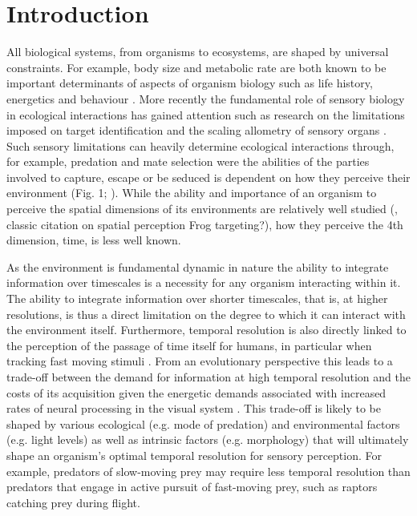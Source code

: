 \section{Introduction}

All biological systems, from organisms to ecosystems, are shaped by universal constraints. For example, body size and metabolic rate are both known to be important determinants of aspects of organism biology such as life history, energetics and behaviour \citep{brown2004, woodward2005, sibly2012metabolic}. More recently the fundamental role of sensory biology in ecological interactions has gained attention such as research on the limitations imposed on target identification and the scaling allometry of sensory organs \citep{howland2004allometry,cronin2005role,garamszegi2002coevolving}. Such sensory limitations can heavily determine ecological interactions through, for example, predation and mate selection were the abilities of the parties involved to capture, escape or be seduced is dependent on how they perceive their environment (Fig. 1; \citealt{cronin2005role,clark2012field,hornstein2000sexual,stevens2007predator}). While the ability and importance of an organism to perceive the spatial dimensions of its environments are relatively well studied (\citep{cronin2005role,clark2012field}, classic citation on spatial perception Frog targeting?), how they perceive the 4th dimension, time, is less well known.

As the environment is fundamental dynamic in nature the ability to integrate information over timescales is a necessity for any organism interacting within it. The ability to integrate information over shorter timescales, that is, at higher resolutions, is thus a direct limitation on the degree to which it can interact with the environment itself. Furthermore, temporal resolution is also directly linked to the perception of the passage of time itself for humans, in particular when tracking fast moving stimuli \citep{hagura2012ready}. From an evolutionary perspective this leads to a trade-off between the demand for information at high temporal resolution and the costs of its acquisition given the energetic demands associated with increased rates of neural processing in the visual system \citep{laughlin2001energy}. This trade-off is likely to be shaped by various ecological (e.g. mode of predation) and environmental factors (e.g. light levels) as well as intrinsic factors (e.g. morphology) that will ultimately shape an organism's optimal temporal resolution for sensory perception. For example, predators of slow-moving prey may require less temporal resolution than predators that engage in active pursuit of fast-moving prey, such as raptors catching prey during flight.

